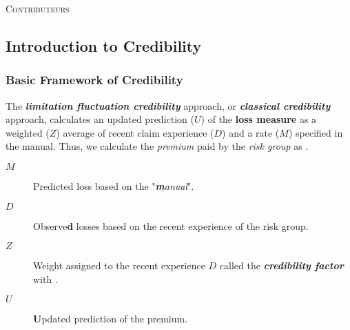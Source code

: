 \documentclass[english]{article}
\begin{document}
\begin{center}
	\textsc{\Large Contributeurs}\\[0.5cm] 
\end{center}


%



\newpage
\raggedcolumns
\begin{multicols*}{2}
\tableofcontents



\newpage
\part{Introduction to Credibility}\label{part:cred}
\section{Basic Framework of Credibility}\label{sec:credBasics}
\begin{rappel_enhanced}[Context]
The \textbf{\textit{limitation fluctuation credibility}} approach, or \textbf{\textit{classical credibility}} approach, calculates an updated prediction ($U$) of the \textbf{loss measure} as a weighted ($Z$) average of recent claim experience ($D$) and a rate ($M$) specified in the manual. Thus, we calculate the \textit{premium} paid by the \textit{risk group} as .
\end{rappel_enhanced}

\begin{distributions}[Notation]
\begin{description}
	\item[$M$]	Predicted loss based on the "\textit{\textbf{m}anual}".
	\item[$D$]	Observe\textbf{d} losses based on the recent experience of the risk group.
	\item[$Z$]	Weight assigned to the recent experience $D$ called the \textbf{\textit{credibility factor}} with . 
	\item[$U$]	\textbf{U}pdated prediction of the premium.
\end{description}
\end{distributions}


\end{multicols*}
\end{document}

